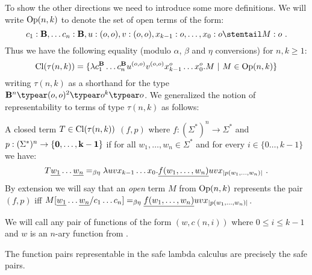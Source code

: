 To show the other directions we need to introduce some more definitions.
We will write ${\rm Op}(n,k)$ to denote the set of open terms
of the form:
$$c_1:\zaiwordtyp, \ldots c_n :\zaiwordtyp, u:(o,o), v:(o,o), x_{k-1}:o, \ldots, x_0 :o \stentail M : o \ .$$
Thus we have the following equality (modulo $\alpha$, $\beta$ and
$\eta$ conversions) for $n,k\geq1$:
$${\rm Cl}(\tau(n,k)) = \{ \lambda c_1^{\mathbf{B}} \ldots c_n^{\mathbf{B}} u^{(o,o)} v^{(o,o)} x_{k-1}^o \ldots x_0^o . M \ | \ M \in {\rm Op}(n,k)  \} $$
writing $\tau(n,k)$ as a shorthand for the type
$\zaiwordtyp^n \typear (o,o)^2\typear o^k\typear o$. We generalized the notion of representability to terms
of type $\tau(n,k)$ as follows:
\begin{definition}
A closed term $T\in{\rm Cl}(\tau(n,k))$ 
$(f,p)$ where $f:(\Sigma^*)^n \rightarrow \Sigma^*$ and $p:(\Sigma^*)^n \rightarrow \{\mathbf{0}, \ldots, \mathbf{k-1}\}$ if for all $w_1,\ldots,w_n\in\Sigma^*$
and for every $i\in \{0\ldots,k-1\}$ we have:
$$
T \zaioncencode{w_1} \ldots \zaioncencode{w_n} =_{\beta\eta} \lambda u v x_{k-1}\ldots x_0 . \zaioncencode{f(w_1,\ldots,w_n)} u v x_{|p(w_1,\ldots,w_n)|} \ .
$$
By extension we will say that an \emph{open} term $M$ from ${\rm Op}(n,k)$
represents the pair $(f,p)$
iff $M[\underline{w_1}\ldots \underline{w_n}/c_1\ldots c_n] =_{\beta\eta} \underline{f(w_1,\ldots,w_n)} u v x_{|p(w_1,\ldots,w_n)|}$.
\end{definition}

We will call  any pair of functions of the form
$(w,c(n,i))$ where $0\leq i\leq k-1$ and $w$ is an $n$-ary function
from \safedefset.

\begin{theorem}
\label{thm:zaionc_pair_characterization_safe} The function pairs
representable in the safe lambda calculus are precisely the safe
pairs.
\end{theorem}

